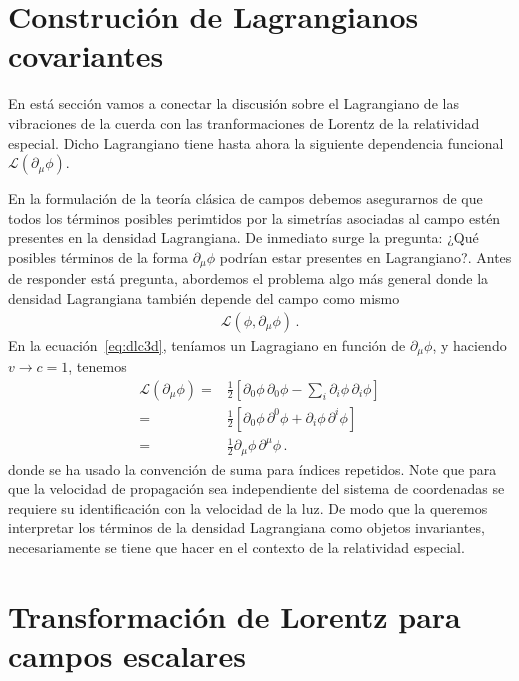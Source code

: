 \section{Construción de Lagrangianos covariantes}

En está sección vamos a conectar la discusión sobre el Lagrangiano de las vibraciones de la cuerda con las tranformaciones de Lorentz de la relatividad especial. Dicho Lagrangiano tiene hasta ahora la siguiente dependencia funcional $\mathcal{L}(\partial_{\mu}\phi)$.

En la formulación de la teoría clásica de campos debemos asegurarnos de que todos los términos posibles perimtidos por la simetrías asociadas al campo estén presentes en la densidad Lagrangiana. De inmediato surge la pregunta: ¿Qué posibles términos de la forma $\partial_{\mu}\phi$ podrían estar presentes en Lagrangiano?. Antes de responder está pregunta, abordemos el problema algo más general donde la densidad Lagrangiana también depende del campo como mismo
\begin{align*}
  \mathcal{L}(\phi,\partial_\mu \phi)\,.
\end{align*}
En la ecuación~\eqref{eq:dlc3d}, teníamos un Lagragiano en función de $\partial_{\mu}\phi$, y haciendo $v\to c=1$, tenemos
\begin{align}
\label{eq:Lpr}
  \mathcal{L}(\partial_{\mu}\phi)
    =&\frac{1}{2}\left[
      {\partial_0\phi}\,{\partial_0\phi}-\sum_i{\partial_i\phi}\,{\partial_i\phi}
   \right]\nonumber\\
    =&\frac{1}{2}\left[
      {\partial_0\phi}\,{\partial^0\phi}+{\partial_i\phi}\,{\partial^i\phi}
   \right]\nonumber\\
   =&\frac{1}{2}{\partial_\mu\phi}\,{\partial^\mu\phi}\,.
\end{align}
donde se ha usado la convención de suma para índices repetidos. Note que para que la velocidad de propagación sea independiente del sistema de coordenadas se requiere su identificación con la velocidad de la luz. De modo que la queremos interpretar los términos de la densidad Lagrangiana como objetos invariantes, necesariamente se tiene que hacer en el contexto de la relatividad especial.




\section{Transformación de Lorentz para campos escalares}

